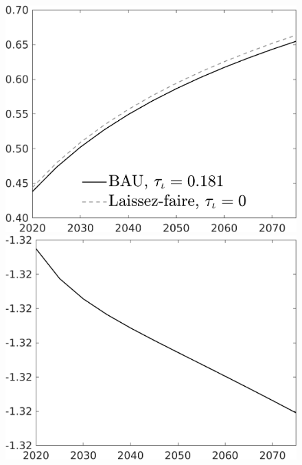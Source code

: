 \documentclass[12pt]{article}
\begin{document}
\begin{figure}[h!!]
\begin{minipage}[]{0.32\textwidth}
	\end{minipage}	
	\begin{minipage}[]{0.32\textwidth}
		\includegraphics[width=1\textwidth]{../../codding_model/own_basedOnFried/optimalPol_010922_revision/figures/all_13Sept22/CompTaul_Equlab_LFBAU_Reg0_LgLf_spillover0_nsk0_xgr0_knspil0_sep1_countec0_GovRev0_etaa0.79_lgd1.png}
	\end{minipage}	
	\begin{minipage}[]{0.32\textwidth}
		\includegraphics[width=1\textwidth]{../../codding_model/own_basedOnFried/optimalPol_010922_revision/figures/all_13Sept22/CompTaul_Equlab_LFBAUPer_Reg0_LgLf_spillover0_nsk0_xgr0_knspil0_sep1_countec0_GovRev0_etaa0.79.png}

\end{minipage}
\end{figure}
\end{document}
